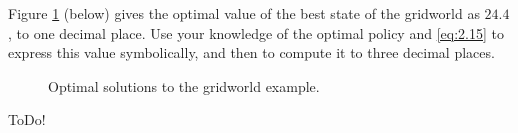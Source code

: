 
\begin{exercise}[Exercise 3.24]

Figure \ref{fig:2.21} (below) gives the optimal value of the best state of the gridworld as $24.4$, to one decimal place.
Use your knowledge of the optimal policy and \eqref{eq:2.15} to express this value symbolically, and then to compute it to three decimal places.

\begin{figure}[H]
    \centering
    \hspace{1cm}
    \hspace{1cm}
    \hspace{0mm}
    \caption
    {
        Optimal solutions to the gridworld example.
    }
    \label{fig:2.21}
\end{figure}

\end{exercise}


\begin{solution}

ToDo!

\end{solution}

